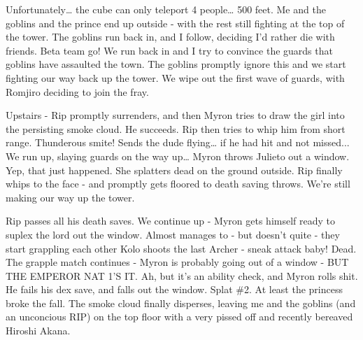 Unfortunately… the cube can only teleport 4 people… 500 feet. Me and the goblins and the prince end up outside - with the rest still fighting at the top of the tower. The goblins run back in, and I follow, deciding I’d rather die with friends. Beta team go! We run back in and I try to convince the guards that goblins have assaulted the town. The goblins promptly ignore this and we start fighting our way back up the tower. We wipe out the first wave of guards, with Romjiro deciding to join the fray.\medskip

Upstairs - Rip promptly surrenders, and then Myron tries to draw the girl into the persisting smoke cloud. He succeeds. Rip then tries to whip him from short range. Thunderous smite! Sends the dude flying… if he had hit and not missed... We run up, slaying guards on the way up… Myron throws Julieto out a window. Yep, that just happened. She splatters dead on the ground outside. Rip finally whips to the face - and promptly gets floored to death saving throws. We’re still making our way up the tower.\medskip

Rip passes all his death saves. We continue up - Myron gets himself ready to suplex the lord out the window. Almost manages to - but doesn’t quite - they start grappling each other Kolo shoots the last Archer - sneak attack baby! Dead. The grapple match continues - Myron is probably going out of a window - BUT THE EMPEROR NAT 1’S IT. Ah, but it’s an ability check, and Myron rolls shit. He fails his dex save, and falls out the window. Splat \#2. At least the princess broke the fall. The smoke cloud finally disperses, leaving me and the goblins (and an unconcious RIP) on the top floor with a very pissed off and recently bereaved Hiroshi Akana.\medskip



%

\clearpage